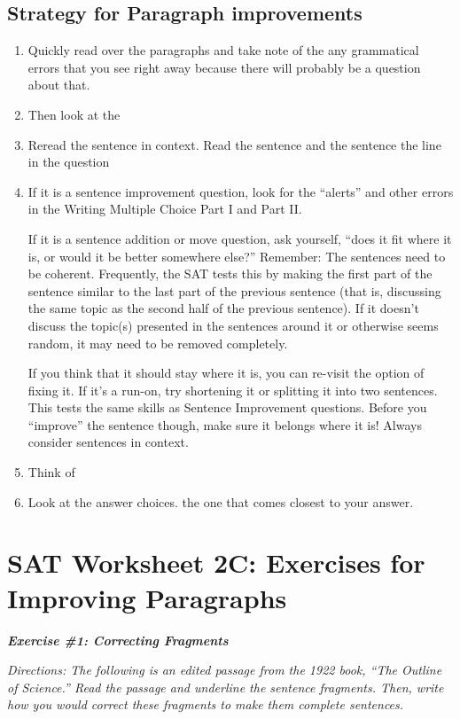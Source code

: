 \bigskip
\subsection{Strategy for Paragraph improvements}
\begin{enumerate}
\item{Quickly read over the paragraphs and take note of the \longline any grammatical errors that you see right away because there will probably be a question about that.}
\item{Then look at the \longline}
\item{Reread the sentence in context. Read the sentence \longline and the sentence \longline the line in the question}
\item{If it is a sentence improvement question, look for the “alerts” and other errors in the Writing Multiple Choice Part I and Part II.}

\bigskip
If it is a sentence addition or move question, ask yourself, “does it fit where it is, or would it be better somewhere else?” Remember: The sentences need to be coherent. Frequently, the SAT tests this by making the first part of the sentence similar to the last part of the previous sentence (that is, discussing the same topic as the second half of the previous sentence). If it doesn't discuss the topic(s) presented in the sentences around it or otherwise seems random, it may need to be removed completely. 

\bigskip
If you think that it should stay where it is, you can re-visit the option of fixing it.  If it's a run-on, try shortening it or splitting it into two sentences.  This tests the same skills as Sentence Improvement questions.  Before you “improve” the sentence though, make sure it belongs where it is!  Always consider sentences in context.

\item{Think of \longline}

\item{Look at the answer choices.  \longline the one that comes closest to your answer.}
\end{enumerate}

\section[Improvement Practice]{SAT Worksheet 2C: Exercises for Improving Paragraphs}
\textbf{\textit{Exercise \#1: Correcting Fragments}}

\bigskip
\textit{Directions: The following is an edited passage from the 1922 book, “The Outline of Science.” Read the passage and underline the sentence fragments. Then, write how you would correct these fragments to make them complete sentences.}

